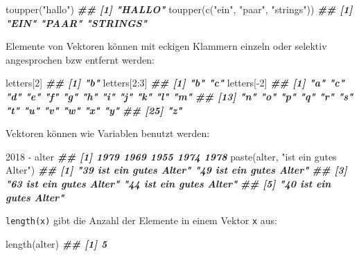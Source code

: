 \documentclass[11pt,german,a4paper]{article}
\newenvironment{Shaded}{\begin{snugshade}}{\end{snugshade}}
\newcommand{\DecValTok}[1]{\textcolor[rgb]{0.00,0.00,0.81}{#1}}
\newcommand{\DocumentationTok}[1]{\textcolor[rgb]{0.56,0.35,0.01}{\textbf{\textit{#1}}}}
\newcommand{\FunctionTok}[1]{\textcolor[rgb]{0.00,0.00,0.00}{#1}}
\newcommand{\NormalTok}[1]{#1}
\newcommand{\SpecialCharTok}[1]{\textcolor[rgb]{0.00,0.00,0.00}{#1}}
\newcommand{\StringTok}[1]{\textcolor[rgb]{0.31,0.60,0.02}{#1}}
\begin{document}
\begin{Shaded}
\begin{Highlighting}[]
\FunctionTok{toupper}\NormalTok{(}\StringTok{"hallo"}\NormalTok{)}
\DocumentationTok{\#\# [1] "HALLO"}
\FunctionTok{toupper}\NormalTok{(}\FunctionTok{c}\NormalTok{(}\StringTok{"ein"}\NormalTok{, }\StringTok{"paar"}\NormalTok{, }\StringTok{"strings"}\NormalTok{))}
\DocumentationTok{\#\# [1] "EIN"     "PAAR"    "STRINGS"}
\end{Highlighting}
\end{Shaded}

Elemente von Vektoren können mit eckigen Klammern einzeln oder selektiv angesprochen bzw entfernt werden:

\begin{Shaded}
\begin{Highlighting}[]
\NormalTok{letters[}\DecValTok{2}\NormalTok{]}
\DocumentationTok{\#\# [1] "b"}
\NormalTok{letters[}\DecValTok{2}\SpecialCharTok{:}\DecValTok{3}\NormalTok{]}
\DocumentationTok{\#\# [1] "b" "c"}
\NormalTok{letters[}\SpecialCharTok{{-}}\DecValTok{2}\NormalTok{]}
\DocumentationTok{\#\#  [1] "a" "c" "d" "e" "f" "g" "h" "i" "j" "k" "l" "m"}
\DocumentationTok{\#\# [13] "n" "o" "p" "q" "r" "s" "t" "u" "v" "w" "x" "y"}
\DocumentationTok{\#\# [25] "z"}
\end{Highlighting}
\end{Shaded}

Vektoren können wie Variablen benutzt werden:

\begin{Shaded}
\begin{Highlighting}[]
\DecValTok{2018} \SpecialCharTok{{-}}\NormalTok{ alter}
\DocumentationTok{\#\# [1] 1979 1969 1955 1974 1978}
\FunctionTok{paste}\NormalTok{(alter, }\StringTok{"ist ein gutes Alter"}\NormalTok{)}
\DocumentationTok{\#\# [1] "39 ist ein gutes Alter" "49 ist ein gutes Alter"}
\DocumentationTok{\#\# [3] "63 ist ein gutes Alter" "44 ist ein gutes Alter"}
\DocumentationTok{\#\# [5] "40 ist ein gutes Alter"}
\end{Highlighting}
\end{Shaded}

\texttt{length(x)} gibt die Anzahl der Elemente in einem Vektor \texttt{x} aus:

\begin{Shaded}
\begin{Highlighting}[]
\FunctionTok{length}\NormalTok{(alter)}
\DocumentationTok{\#\# [1] 5}
\end{Highlighting}
\end{Shaded}
\end{document}
